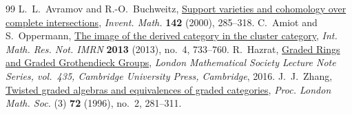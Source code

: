 \documentclass[10pt,a4paper]{amsart}
\numberwithin{equation}{section}
\begin{document}
\begin{thebibliography}{99}
 {\sc L.~L.~Avramov} and {\sc R.-O.~Buchweitz}, \href{https://doi.org/10.1007/s002220000090}{Support varieties and cohomology over complete intersections}, \emph{Invent. Math.} \textbf{142} (2000), 285--318.
 {\sc C.~Amiot} and {\sc S.~Oppermann}, \href{https://doi.org/10.1093/imrn/rns010}{The image of the derived category in the cluster category}, \emph{Int. Math. Res. Not. IMRN} \textbf{2013} (2013), no.~4, 733--760.
 {\sc R.~Hazrat}, \href{https://doi.org/10.1017/CBO9781316717134}{Graded Rings and Graded Grothendieck Groups}, \emph{London Mathematical Society Lecture Note Series, vol.~435, Cambridge University Press, Cambridge}, 2016.
 {\sc J.~J.~Zhang}, \href{https://doi.org/10.1112/plms/s3-72.2.281}{Twisted graded algebras and equivalences of graded categories}, \emph{Proc. London Math. Soc.} (3) \textbf{72} (1996), no.~2, 281--311.
\end{thebibliography}
\end{document}
